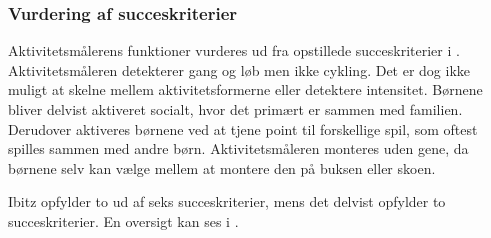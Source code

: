 \subsubsection{Vurdering af succeskriterier}
Aktivitetsmålerens funktioner vurderes ud fra opstillede succeskriterier i . \\
Aktivitetsmåleren detekterer gang og løb men ikke cykling. Det er dog ikke muligt at skelne mellem aktivitetsformerne eller detektere intensitet. Børnene bliver delvist aktiveret socialt, hvor det primært er sammen med familien. Derudover aktiveres børnene ved at tjene point til forskellige spil, som oftest spilles sammen med andre børn. Aktivitetsmåleren monteres uden gene, da børnene selv kan vælge mellem at montere den på buksen eller skoen.  

Ibitz opfylder to ud af seks succeskriterier, mens det delvist opfylder to succeskriterier. En oversigt kan ses i .

